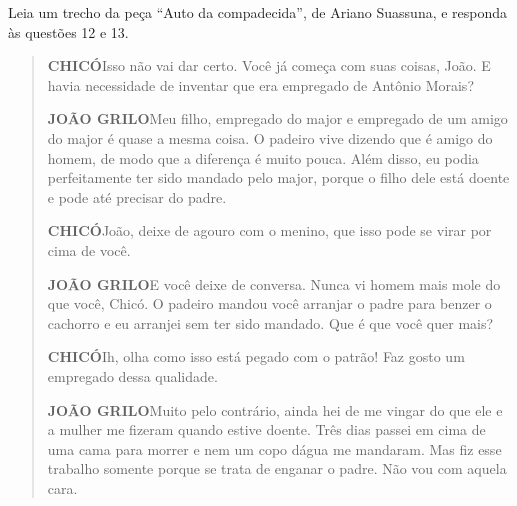 


\pagebreak

\noindent Leia um trecho da peça ``Auto da compadecida'', de Ariano Suassuna, e
responda às questões 12 e 13.

\begin{quote}
\noindent\textbf{CHICÓ}\quad Isso não vai dar certo. Você já começa com suas coisas, João. E
havia necessidade de inventar que era empregado de Antônio Morais?

\noindent\textbf{JOÃO GRILO}\quad Meu filho, empregado do major e empregado de um amigo do
major é quase a mesma coisa. O padeiro vive dizendo que é amigo do
homem, de modo que a diferença é muito pouca. Além disso, eu podia
perfeitamente ter sido mandado pelo major, porque o filho dele está
doente e pode até precisar do padre.

\noindent\textbf{CHICÓ}\quad João, deixe de agouro com o menino, que isso pode se virar por
cima de você.

\noindent\textbf{JOÃO GRILO}\quad E você deixe de conversa. Nunca vi homem mais mole do que
você, Chicó. O padeiro mandou você arranjar o padre para benzer o
cachorro e eu arranjei sem ter sido mandado. Que é que você quer mais?

\noindent\textbf{CHICÓ}\quad Ih, olha como isso está pegado com o patrão! Faz gosto um
empregado dessa qualidade.

\noindent\textbf{JOÃO GRILO}\quad Muito pelo contrário, ainda hei de me vingar do que ele e a
mulher me fizeram quando estive doente. Três dias passei em cima de uma
cama para morrer e nem um copo dágua me mandaram. Mas fiz esse trabalho
somente porque se trata de enganar o padre. Não vou com aquela cara.

\end{quote}

